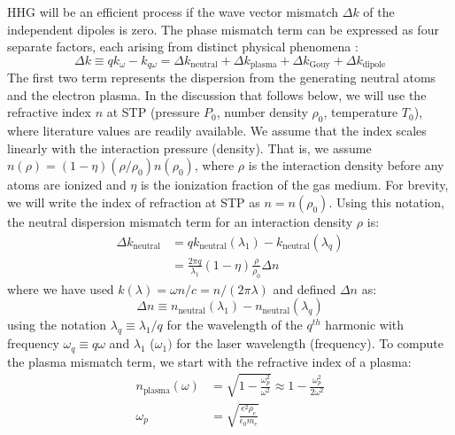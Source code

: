 HHG will be an efficient process if the wave vector mismatch $\Delta k$ of the independent dipoles is zero. The phase mismatch term can be expressed as four separate factors, each arising from distinct physical phenomena \cite{rothhardtAbsorptionlimitedPhasematchedHigh2014}:
\begin{equation}
\Delta k \equiv q k_{\omega} - k_{q \omega} = \Delta k_{\textrm{neutral}} + \Delta k_{\textrm{plasma}} + \Delta k_{\textrm{Gouy}} + \Delta k_{\textrm{dipole}}
\label{eqn:phase_mismatch}
\end{equation}
The first two term represents the dispersion from the generating neutral atoms and the electron plasma. In the discussion that follows below, we will use the refractive index $n$ at STP (pressure $P_0$, number density $\rho_0$, temperature $T_0$), where literature values are readily available. We assume that the index scales linearly with the interaction pressure (density). That is, we assume $n(\rho) = (1-\eta)(\rho / \rho_0) n(\rho_0)$, where $\rho$ is the interaction density before any atoms are ionized and $\eta$ is the ionization fraction of the gas medium. For brevity, we will write the index of refraction at STP as $n = n(\rho_0)$. Using this notation, the neutral dispersion mismatch term for an interaction density $\rho$ is:
\begin{align}
\Delta k_{\textrm{neutral}} &= q k_{\textrm{neutral}}(\lambda_1) - k_{\textrm{neutral}}(\lambda_{q}) \nonumber \\
&= \frac{2 \pi q}{\lambda_1} (1-\eta) \frac{\rho}{\rho_0}\Delta n
\label{eqn:deltak_neutral}
\end{align}
where we have used $k(\lambda)= \omega n /c = n / (2 \pi \lambda)$ and defined $\Delta n$ as:
\begin{equation}
\Delta n \equiv n_{\textrm{neutral}}(\lambda_1) - n_{\textrm{neutral}}(\lambda_q)
\label{eqn:refractive_index_mismatch}
\end{equation}
using the notation $\lambda_q \equiv \lambda_1 / q$ for the wavelength of the $q^{th}$ harmonic with frequency $\omega_q \equiv q \omega$ and $\lambda_1$ ($\omega_1)$ for the laser wavelength (frequency). To compute the plasma mismatch term, we start with the refractive index of a plasma:
\begin{align}
n_{\textrm{plasma}}(\omega) &= \sqrt{1 - \frac{\omega_p^2}{\omega^2}} \approx 1 - \frac{\omega_p^2}{2 \omega^2} \\
\omega_p &= \sqrt{\frac{e^2 \rho_e}{\epsilon_0 m_e}}
\end{align}
